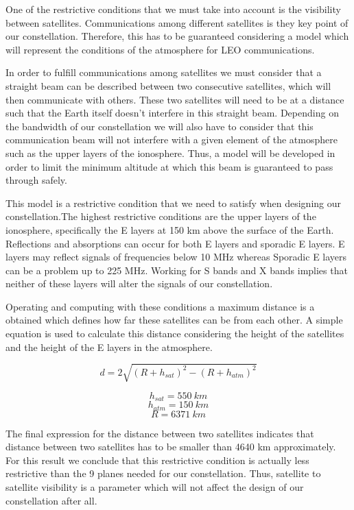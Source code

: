 One of the restrictive conditions that we must take into account is the visibility between satellites. Communications among different satellites is they key point of our constellation. Therefore, this has to be guaranteed considering a model which will represent the conditions of the atmosphere for LEO communications.

In order to fulfill communications among satellites we must consider that a straight beam can be described between two consecutive satellites, which will then communicate with others. These two satellites will need to be at a distance such that the Earth itself doesn't interfere in this straight beam. Depending on the bandwidth of our constellation we will also have to consider that this communication beam will not interfere with a given element of the atmosphere such as the upper layers of the ionosphere. Thus, a model will be developed in order to limit the minimum altitude at which this beam is guaranteed to pass through safely.

This model is a restrictive condition that we need to satisfy when designing our constellation.The highest restrictive conditions are the upper layers of the ionosphere, specifically the E layers at 150 km above the surface of the Earth. Reflections and absorptions can occur for both E layers and sporadic E layers. E layers may reflect signals of frequencies below 10 MHz whereas Sporadic E layers can be a problem up to 225 MHz. Working for S bands and X bands implies that neither of these layers will alter the signals of our constellation.

Operating and computing with these conditions a maximum distance is a obtained which defines how far these satellites can be from each other. A simple equation is used to calculate this distance considering the height of the satellites and the height of the E layers in the atmosphere.

\[ d = 2 \sqrt{(R+h_{sat})^2 - (R+h_{atm})^2} \]

\[ h_{sat} = 550\ km\] 
\[ h_{atm} = 150\ km\]
\[R = 6371\ km\]

The final expression for the distance between two satellites indicates that distance between two satellites has to be smaller than 4640 km approximately. For this result we conclude that this restrictive condition is actually less restrictive than the 9 planes needed for our constellation. Thus, satellite to satellite visibility is a parameter which will not affect the design of our constellation after all.